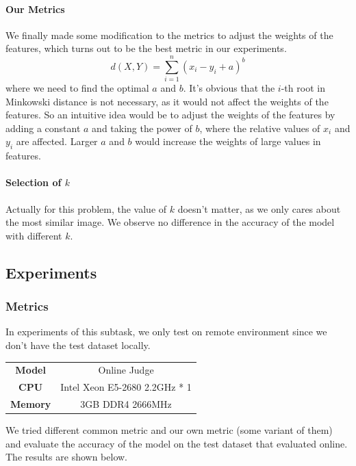 \documentclass{article}
\begin{document}
\paragraph{Our Metrics} We finally made some modification to the metrics to adjust the weights of the features, which turns out to be the best metric in our experiments.
\[
    d(X, Y) = \sum_{i=1}^{n} (x_i - y_i + a)^b
\]
where we need to find the optimal $a$ and $b$. It's obvious that the $i$-th root in Minkowski distance is not necessary, as it would not affect the weights of the features. So an intuitive idea would be to adjust the weights of the features by adding a constant $a$ and taking the power of $b$, where the relative values of $x_i$ and $y_i$ are affected. Larger $a$ and $b$ would increase the weights of large values in features.

\paragraph{Selection of $k$} Actually for this problem, the value of $k$ doesn't matter, as we only cares about the most similar image. We observe no difference in the accuracy of the model with different $k$.

\subsection{Experiments}
\subsubsection{Metrics}

In experiments of this subtask, we only test on remote environment since we don't have the test dataset locally.

\begin{table}[!htbp]
    \begin{center}
    \begin{tabular}[c]{cc}
        \textbf{Model} & Online Judge \\
        \textbf{CPU} & Intel Xeon E5-2680 2.2GHz * 1 \\
        \textbf{Memory} & 3GB DDR4 2666MHz
    \end{tabular}
    \end{center}
\end{table}

We tried different common metric and our own metric (some variant of them) and evaluate the accuracy of the model on the test dataset that evaluated online. The results are shown below.
\end{document}
